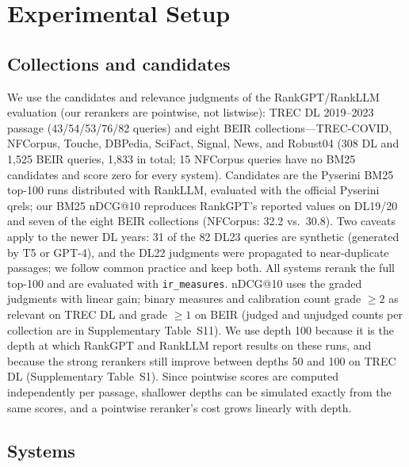 \section{Experimental Setup}\label{sec:setup}

\subsection{Collections and candidates}

We use the candidates and relevance judgments of the RankGPT/RankLLM evaluation\cite{sun2023rankgpt,rankllm} (our rerankers are pointwise, not listwise): TREC DL 2019--2023 passage\cite{craswell2020dl19,craswell2021dl20,craswell2022dl21,craswell2023dl22,craswell2024dl23} (43/54/53/76/82 queries) and eight BEIR collections\cite{thakur2021beir}---TREC-COVID, NFCorpus, Touche, DBPedia, SciFact, Signal, News, and Robust04 (308 DL and 1{,}525 BEIR queries, 1{,}833 in total; 15 NFCorpus queries have no BM25 candidates and score zero for every system).
Candidates are the Pyserini\cite{pyserini} BM25 top-100 runs distributed with RankLLM, evaluated with the official Pyserini qrels; our BM25 nDCG@10 reproduces RankGPT's reported values on DL19/20 and seven of the eight BEIR collections (NFCorpus: 32.2 vs.\ 30.8).
Two caveats apply to the newer DL years: 31 of the 82 DL23 queries are synthetic (generated by T5 or GPT-4), and the DL22 judgments were propagated to near-duplicate passages; we follow common practice and keep both.
All systems rerank the full top-100 and are evaluated with \texttt{ir\_measures}\cite{irmeasures}. nDCG@10 uses the graded judgments with linear gain; binary measures and calibration count grade $\ge2$ as relevant on TREC DL and grade $\ge1$ on BEIR (judged and unjudged counts per collection are in Supplementary Table~S11). We use depth 100 because it is the depth at which RankGPT and RankLLM report results on these runs, and because the strong rerankers still improve between depths 50 and 100 on TREC DL (Supplementary Table~S1). Since pointwise scores are computed independently per passage, shallower depths can be simulated exactly from the same scores, and a pointwise reranker's cost grows linearly with depth.

\subsection{Systems}

